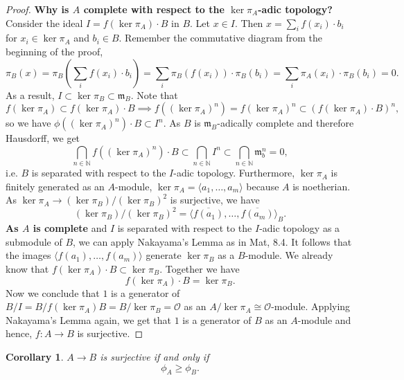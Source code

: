 \documentclass{article}
\theoremstyle{plain}%
\newtheorem{corollary}{Corollary}[section]
\theoremstyle{definition}
\theoremstyle{remark}
\begin{document}
\begin{proof}
    \textbf{Why is \(A\) complete with respect to the \(\ker \pi_A\)-adic topology?}
    Consider the ideal \(I = f(\ker \pi_A) \cdot B\) in \(B\).
    Let \(x \in I\). Then \(x = \sum_i f(x_i) \cdot b_i\) for \(x_i \in \ker \pi_A\) and \(b_i \in B\).
    Remember the commutative diagram from the beginning of the proof,
    \[
        \pi_B(x) = \pi_B\left(\sum_i f(x_i)\cdot b_i\right) 
        = \sum_i \pi_B(f(x_i))\cdot \pi_B(b_i) 
        = \sum_i\pi_A(x_i)\cdot \pi_B(b_i) = 0. 
    \]
    As a result, \(I \subset \ker \pi_B \subset \mathfrak{m}_B\).
    Note that
    \[
        f(\ker \pi_A) \subset f(\ker \pi_A)\cdot B \implies f((\ker \pi_A)^n) 
        = f(\ker \pi_A)^n \subset (f(\ker \pi_A)\cdot B)^n,
    \]
    so we have \(\phi((\ker \pi_A)^n)\cdot B \subset I^n\).
    As \(B\) is \(\mathfrak{m}_B\)-adically complete and therefore Hausdorff, we get
    \[
        \bigcap_{n \in \mathbb N} f((\ker \pi_A)^n) \cdot B \subset \bigcap_{n \in \mathbb N} I^n 
        \subset \bigcap_{n \in \mathbb N} \mathfrak{m}_b^n = 0,
    \]
    i.e. \(\!B\) is separated with respect to the \(I\)-adic topology.
    Furthermore, \(\ker \pi_A\) is finitely generated as an \(A\)-module, 
    \(\ker \pi_A = \langle a_1, \dots, a_m\rangle\) because \(A\) is noetherian. 
    As \(\ker \pi_A \to (\ker \pi_B)/(\ker \pi_B)^2\) is surjective, we have 
    \[(\ker \pi_B)/(\ker \pi_B)^2 = \langle \overline{f(a_1)}, \dots, \overline{f(a_m)}\rangle_B.\]
    \textbf{As \(A\) is complete} and \(I\) is separated with respect to the \(I\)-adic topology 
    as a submodule of \(B\), we can apply Nakayama's Lemma as in Mat, 8.4. 
    It follows that the images \(\langle f(a_1), \dots, f(a_m)\rangle\) generate \(\ker \pi_B\)
    as a \(B\)-module. We already know that \(f(\ker \pi_A) \cdot B \subset \ker \pi_B\). 
    Together we have
    \[
        f(\ker \pi_A) \cdot B = \ker \pi_B.
    \]
    Now we conclude that \(1\) is a generator of \(B/I = B/f(\ker \pi_A) B = B/\ker \pi_B = \mathcal{O}\) as an 
    \(A/\ker \pi_A \cong \mathcal{O}\)-module.
    Applying Nakayama's Lemma again, we get that \(1\) is a generator of \(B\) as an \(A\)-module 
    and hence, \(f\colon A \to B\) is surjective.
\end{proof}

\begin{corollary}\label{cor:surjectivity_phi}
    \(A \to B\) is surjective if and only if \[\phi_A \geq \phi_B.\]
\end{corollary}
\end{document}
